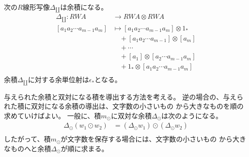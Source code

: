 	\begin{todo}[ここまで]\label{todo:ここまで} %
	\end{todo} %

	次の$R$線形写像$\Delta_\amalg$は余積になる。
	\begin{equation}\begin{split} %
		\Delta_\amalg: RWA &\to RWA\otimes RWA \\
			[a_1a_2\cdots a_{m-1}a_m] 
				&\mapsto [a_1a_2\cdots a_{m-1}a_m]\otimes 1_* \\
				&\quad + [a_1a_2\cdots a_{m-1}]\otimes [a_m] \\
				&\quad + \cdots \\
				&\quad + [a_1]\otimes [a_2\cdots a_{m-1}a_m] \\
				&\quad + 1_*\otimes [a_1a_2\cdots a_{m-1}a_m] \\
	\end{split}\end{equation} %
	余積$\Delta_\amalg$に対する余単位射は$\epsilon_*$となる。

	\begin{todo}[余積から積の導出]\label{todo:余積から積の導出} %
		与えられた余積と双対になる積を導出する方法を考える。
		逆の場合の、与えられた積に双対になる余積の導出は、文字数の小さいもの
		から大きなものを順の求めていけばよい。
		一般に、積$m_\odot$に双対な余積$\Delta_\odot$は次のようになる。
		\begin{equation}\begin{split} %
			\Delta_\odot(w_1\odot w_2) &= (\Delta_\odot w_1)\odot(\Delta_\odot w_2) \\
		\end{split}\end{equation} %
		したがって、積$m_\odot$が文字数を保存する場合には、文字数の小さいもの
		から大きなものへと余積$\Delta_\odot$が順に求まる。
	\end{todo} %
